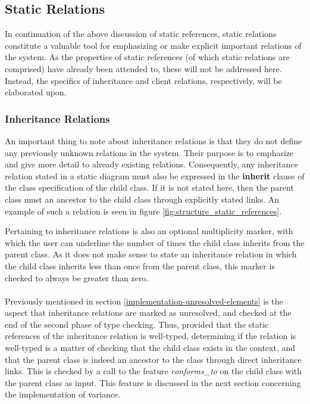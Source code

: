 \subsection{Static Relations}
In continuation of the above discussion of static references, static relations constitute a valuable tool for emphasizing or make explicit important relations of the system. As the properties of static references (of which static relations are comprised) have already been attended to, these will not be addressed here. Instead, the specifics of inheritance and client relations, respectively, will be elaborated upon.
\subsubsection{Inheritance Relations}
An important thing to note about inheritance relations is that they do not define any previously unknown relations in the system. Their purpose is to emphasize and give more detail to already existing relations. Consequently, any inheritance relation stated in a static diagram must also be expressed in the \textbf{inherit} clause of the class specification of the child class. If it is not stated here, then the parent class must an ancestor to the child class through explicitly stated links. An example of such a relation is seen in figure \ref{fig:structure_static_references}.

Pertaining to inheritance relations is also an optional multiplicity marker, with which the user can underline the number of times the child class inherits from the parent class. As it does not make sense to state an inheritance relation in which the child class inherits less than once from the parent class, this marker is checked to always be greater than zero.
\paragraph{}
Previously mentioned in section \ref{implementation-unresolved-elements} is the aspect that inheritance relations are marked as unresolved, and checked at the end of the second phase of type checking. Thus, provided that the static references of the inheritance relation is well-typed, determining if the relation is well-typed is a matter of checking that the child class exists in the context, and that the parent class is indeed an ancestor to the class through direct inheritance links. This is checked by a call to the feature \textit{conforms\_to} on the child class with the parent class as input. This feature is discussed in the next section concerning the implementation of variance. 
